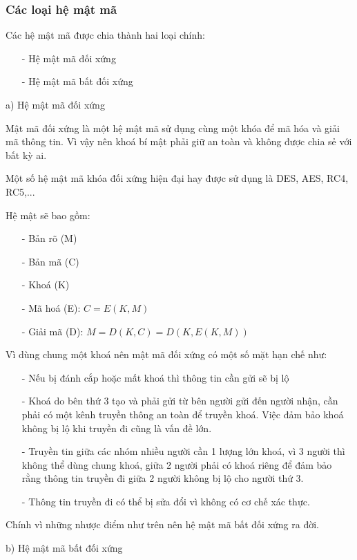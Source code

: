 \subsubsection{Các loại hệ mật mã}
Các hệ mật mã được chia thành hai loại chính: 
\begin{itemize}
    \item[-] Hệ mật mã đối xứng
    \item[-] Hệ mật mã bất đối xứng
\end{itemize}

a) Hệ mật mã đối xứng

Mật mã đối xứng là một hệ mật mã sử dụng cùng một khóa để mã hóa và giải mã thông tin.
Vì vậy nên khoá bí mật phải giữ an toàn và không được chia sẻ với bất kỳ ai.

Một số hệ mật mã khóa đối xứng hiện đại hay được sử dụng là DES, AES, RC4, RC5,...

Hệ mật sẽ bao gồm:
\begin{itemize}
    \item[-] Bản rõ (M)
    \item[-] Bản mã (C)
    \item[-] Khoá (K)
    \item[-] Mã hoá (E): $C = E(K,M)$
    \item[-] Giải mã (D): $M = D(K,C) = D(K,E(K,M))$
\end{itemize}

Vì dùng chung một khoá nên mật mã đối xứng có một số mặt hạn chế như:
\begin{itemize}
    \item[-] Nếu bị đánh cắp hoặc mất khoá thì thông tin cần gửi sẽ bị lộ
    \item[-] Khoá do bên thứ 3 tạo và phải gửi từ bên người gửi đến người nhận, 
    cần phải có một kênh truyền thông an toàn để truyền khoá. Việc đảm bảo khoá 
    không bị lộ khi truyền đi cũng là vấn đề lớn.
    \item[-] Truyền tin giữa các nhóm nhiều người cần 1 lượng lớn khoá, vì 3 người 
    thì không thể dùng chung khoá, giữa 2 người phải có khoá riêng để đảm bảo rằng
    thông tin truyền đi giữa 2 người không bị lộ cho người thứ 3.
    \item[-] Thông tin truyền đi có thể bị sửa đổi vì không có cơ chế xác thực.    
\end{itemize}

Chính vì những nhược điểm như trên nên hệ mật mã bất đối xứng ra đời.

b) Hệ mật mã bất đối xứng

